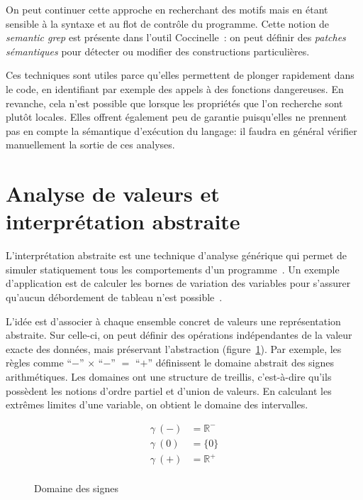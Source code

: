 On peut continuer cette approche en recherchant des motifs mais en étant
sensible à la syntaxe et au flot de contrôle du programme. Cette notion de
\emph{semantic grep} est présente dans l'outil
Coccinelle~\cite{coccinelle09,coccinelle11}: on peut définir des \emph{patches
sémantiques} pour détecter ou modifier des constructions particulières.

Ces techniques sont utiles parce qu'elles permettent de plonger rapidement dans
le code, en identifiant par exemple des appels à des fonctions dangereuses. En
revanche, cela n'est possible que lorsque les propriétés que l'on recherche sont
plutôt locales. Elles offrent également peu de garantie puisqu'elles ne prennent
pas en compte la sémantique d'exécution du langage: il faudra en général
vérifier manuellement la sortie de ces analyses.

\section{Analyse de valeurs et interprétation abstraite}
\label{sec:absint}

L'interprétation abstraite est une technique d'analyse générique qui permet de
simuler statiquement tous les comportements d'un
programme~\cite{Cousot77,Cousot92-1}. Un exemple d'application est de calculer
les bornes de variation des variables pour s'assurer qu'aucun débordement de
tableau n'est possible~\cite{AllamigeonHymansSSTIC07}.

L'idée est d'associer à chaque ensemble concret de valeurs une représentation
abstraite. Sur celle-ci, on peut définir des opérations indépendantes de la
valeur exacte des données, mais préservant l'abstraction
(figure~\ref{fig:dom-sig}). Par exemple, les règles comme
\enquote{$-$} $×$ \enquote{$-$} $=$ \enquote{$+$}
définissent le domaine abstrait des signes arithmétiques. Les domaines ont une
structure de treillis, c'est-à-dire qu'ils possèdent les notions d'ordre partiel
et d'union de valeurs. En calculant les extrêmes limites d'une variable, on
obtient le domaine des intervalles.

\begin{figure}[h]%
\centering

\begin{minipage}{0.4\textwidth}
\end{minipage}
\begin{minipage}{0.4\textwidth}
  \begin{align*}
  γ~(-) &= ℝ^- \\
  γ~(0) &= \{0\} \\
  γ~(+) &= ℝ^+ \\
  \end{align*}
\end{minipage}

\caption{Domaine des signes}
\label{fig:dom-sig}
\end{figure}%

